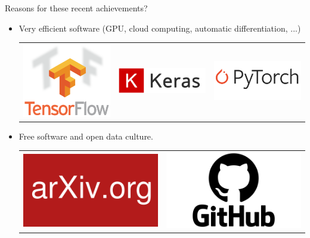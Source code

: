 \documentclass[handout, 10pt]{beamer}
\begin{document}
\begin{frame}[t]{Reasons for these recent achievements?}
\begin{itemize}
{}      

\item<4-> Very efficient software (GPU, cloud computing, automatic differentiation, ...)
 {
\begin{center}
    \begin{tabular}{ccc}
        \includegraphics[width=.25\textwidth]{fig/L1/TensorFlowLogo.png} &  
         \includegraphics[width=.25\textwidth]{fig/L1/keraslogo.png}& 
         \includegraphics[width=.25\textwidth]{fig/L1/pytorchlogo.png}\\
    \end{tabular}
\end{center}
}


\item<5-> Free software and open data culture.
 {
\begin{center}
    \begin{tabular}{cc}
        \includegraphics[width=.25\textwidth]{fig/L1/ArXiv_logo.png} &  
         \includegraphics[width=.25\textwidth]{fig/L1/GitHub-Logo.png}\\
    \end{tabular}
\end{center}
}

    \end{itemize}

\end{frame}
\end{document}
